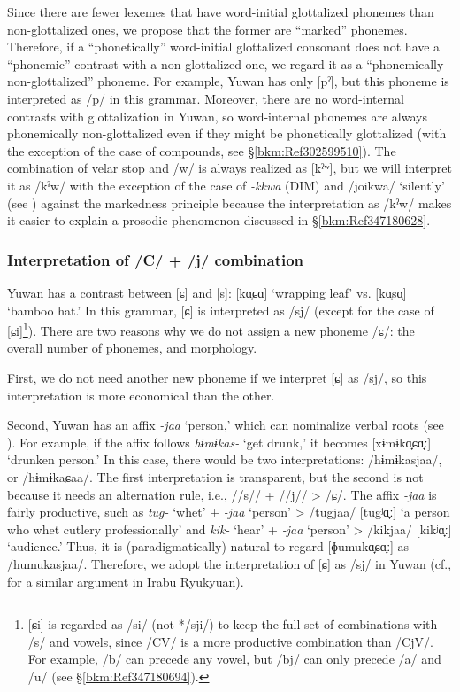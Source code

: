 Since there are fewer lexemes that have word-initial glottalized phonemes than non-glottalized ones, we propose that the former are “marked” phonemes. Therefore, if a “phonetically” word-initial glottalized consonant does not have a “phonemic” contrast with a non-glottalized one, we regard it as a “phonemically non-glottalized” phoneme. For example, Yuwan has only [pˀ], but this phoneme is interpreted as /p/ in this grammar. Moreover, there are no word-internal contrasts with glottalization in Yuwan, so word-internal phonemes are always phonemically non-glottalized even if they might be phonetically glottalized (with the exception of the case of compounds, see §\ref{bkm:Ref302599510}). The combination of velar stop and /w/ is always realized as [kˀʷ], but we will interpret it as /kˀw/ with the exception of the case of \textit{{}-kkwa} (DIM) and /joikwa/ ‘silently’ (see ) against the markedness principle because the interpretation as /kˀw/ makes it easier to explain a prosodic phenomenon discussed in §\ref{bkm:Ref347180628}.

\subsubsection{Interpretation of /C/ + /j/ combination}
\label{bkm:Ref347180720}\hypertarget{RefHeadingToc395696975}{}
Yuwan has a contrast between [ɕ] and [s]: [kɑ̟ɕɑ̟] ‘wrapping leaf’ vs. [kɑ̟sɑ̟] ‘bamboo hat.’ In this grammar, [ɕ] is interpreted as /sj/ (except for the case of [ɕi]\footnote{[ɕi] is regarded as /si/ (not */sji/) to keep the full set of combinations with /s/ and vowels, since /CV/ is a more productive combination than /CjV/. For example, /b/ can precede any vowel, but /bj/ can only precede /a/ and /u/ (see §\ref{bkm:Ref347180694}).}). There are two reasons why we do not assign a new phoneme /ɕ/:  the overall number of phonemes, and  morphology.

First, we do not need another new phoneme if we interpret [ɕ] as /sj/, so this interpretation is more economical than the other.

Second, Yuwan has an affix \textit{{}-jaa} ‘person,’ which can nominalize verbal roots (see ). For example, if the affix follows \textit{hɨmɨkas-} ‘get drunk,’ it becomes [xɨmɨkɑ̟ɕɑ̟ː] ‘drunken person.’ In this case, there would be two interpretations:  /hɨmɨkasjaa/, or  /hɨmɨkaɕaa/. The first interpretation is transparent, but the second is not because it needs an alternation rule, i.e., //s// + //j// > /ɕ/. The affix \textit{{}-jaa} is fairly productive, such as \textit{tug-} ‘whet’ + \textit{{}-jaa} ‘person’ > /tugjaa/ [tugʲɑ̟ː] ‘a person who whet cutlery professionally’ and \textit{kik-} ‘hear’ + \textit{{}-jaa} ‘person’ > /kikjaa/ [kikʲɑ̟ː] ‘audience.’ Thus, it is (paradigmatically) natural to regard [ɸumukɑ̟ɕɑ̟ː] as /humukasjaa/. Therefore, we adopt the interpretation of [ɕ] as /sj/ in Yuwan (cf., \citet[79-81]{Shimoji2008} for a similar argument in Irabu Ryukyuan).

